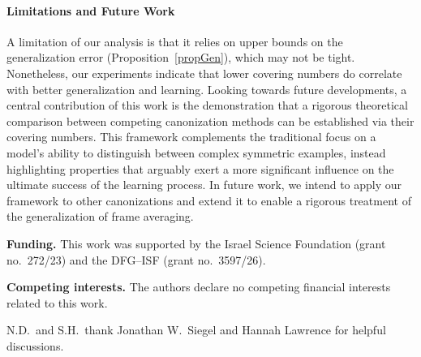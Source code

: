 \paragraph{Limitations and Future Work} A limitation of our analysis is that it relies on upper bounds on
the generalization error (Proposition~\ref{propGen}), which may not be tight. Nonetheless, our experiments
indicate that lower covering numbers do correlate with better generalization and learning. Looking
towards future developments, a central contribution of this work is the demonstration that a rigorous
theoretical comparison between competing canonization methods can be established via their covering
numbers. This framework complements the traditional focus on a model’s ability to distinguish
between complex symmetric examples, instead highlighting properties that arguably exert a more
significant influence on the ultimate success of the learning process. In future work, we intend
to apply our framework to other canonizations and extend it to enable a rigorous treatment of the
generalization of frame averaging.
\begin{ack}
\textbf{Funding.} This work was supported by the Israel Science Foundation
(grant no.~272/23) and the DFG--ISF (grant no.~3597/26).

\textbf{Competing interests.} The authors declare no competing financial
interests related to this work.

N.D.\ and S.H.\ thank Jonathan W.~Siegel and Hannah Lawrence for helpful
discussions.
\end{ack}
